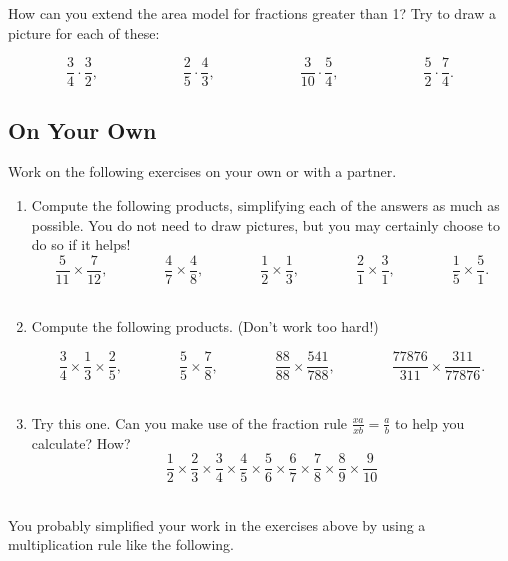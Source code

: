 \begin{problem}
How can you extend the area model for fractions greater than 1?  Try to draw a picture for each of these:

\[
\frac 3 4 \cdot \frac 3 2,
\qquad \qquad\qquad
\frac 2 5 \cdot \frac 4 3,
\qquad \qquad\qquad
\frac 3 {10} \cdot \frac 5 4,
\qquad \qquad\qquad
\frac 5 2 \cdot \frac 7 4.
\]

\end{problem}





\subsection*{On Your Own} 
Work on the following exercises on your own or with a partner.

\begin{enumerate}
\item
Compute the following products, simplifying each of the answers as
much as possible.  You do not need to draw pictures, but you may certainly choose to do so if it helps! 
\[
\frac 5{11} \times \frac 7{12},
\qquad\qquad
\frac 4 7 \times \frac 4 8,
\qquad\qquad
\frac 1 2 \times \frac 1 3,
\qquad\qquad
\frac 2 1 \times \frac 3 1,
\qquad\qquad
\frac 15 \times \frac 51.
\]\\

\item
Compute the following products.  (Don't work too hard!)

\[
\frac 3 4 \times \frac 1 3 \times \frac 2 5,
\qquad\qquad
\frac 5 5 \times \frac 7 8 ,
\qquad\qquad
\frac{88}{88} \times \frac{541}{788},
\qquad\qquad
\frac{77876}{311} \times \frac{311}{77876}.
\]\\

\item
Try this one.  Can you make use of the fraction rule $\frac{xa}{xb} = \frac a b$ to help you calculate?  How?
\[
\frac 1 2 \times \frac 23 \times \frac 34 \times \frac 45 \times \frac 56\times \frac 67 \times \frac 78 \times\frac 89 \times
\frac9{10}
\]\\

\end{enumerate}


You probably simplified your work in the exercises above by using a multiplication rule like the following.


